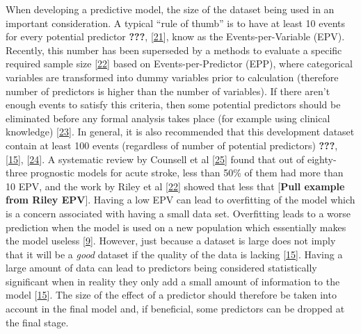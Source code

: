 \documentclass[12pt,PhD,twoside,openright]{muthesis}
\begin{document}
When developing a predictive model, the size of the dataset being used in an important consideration. A typical ``rule of thumb'' is to have at least 10 events for every potential predictor {\textbf{???}}, {[}\protect\hyperlink{ref-peduzzi_simulation_1996}{21}{]}, know as the Events-per-Variable (EPV). Recently, this number has been superseded by a methods to evaluate a specific required sample size {[}\protect\hyperlink{ref-riley_minimum_2019}{22}{]} based on Events-per-Predictor (EPP), where categorical variables are transformed into dummy variables prior to calculation (therefore number of predictors is higher than the number of variables). If there aren't enough events to satisfy this criteria, then some potential predictors should be eliminated before any formal analysis takes place (for example using clinical knowledge) {[}\protect\hyperlink{ref-sauerbrei_selection_2007}{23}{]}. In general, it is also recommended that this development dataset contain at least 100 events (regardless of number of potential predictors) {\textbf{???}}, {[}\protect\hyperlink{ref-riley_external_2016}{15}{]}, {[}\protect\hyperlink{ref-vergouwe_substantial_2005}{24}{]}. A systematic review by Counsell et al {[}\protect\hyperlink{ref-counsell_systematic_2001}{25}{]} found that out of eighty-three prognostic models for acute stroke, less than 50\% of them had more than 10 EPV, and the work by Riley et al {[}\protect\hyperlink{ref-riley_minimum_2019}{22}{]} showed that less that {[}\textbf{Pull example from Riley EPV}{]}. Having a low EPV can lead to overfitting of the model which is a concern associated with having a small data set. Overfitting leads to a worse prediction when the model is used on a new population which essentially makes the model useless {[}\protect\hyperlink{ref-royston_prognosis_2009}{9}{]}. However, just because a dataset is large does not imply that it will be a \emph{good} dataset if the quality of the data is lacking {[}\protect\hyperlink{ref-riley_external_2016}{15}{]}. Having a large amount of data can lead to predictors being considered statistically significant when in reality they only add a small amount of information to the model {[}\protect\hyperlink{ref-riley_external_2016}{15}{]}. The size of the effect of a predictor should therefore be taken into account in the final model and, if beneficial, some predictors can be dropped at the final stage.
\end{document}
